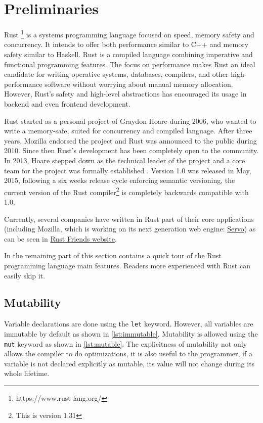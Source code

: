 \chapter{Preliminaries}
\label{chapter:preliminaries}

Rust \footnote{https://www.rust-lang.org/} is a systems programming language focused on speed, memory safety and concurrency. It intends to offer both performance similar to C++ and memory safety similar to Haskell. Rust is a compiled language combining imperative and functional programming features. The focus on performance makes Rust an ideal candidate for writing operative systems, databases, compilers, and other high-performance software without worrying about manual memory allocation. However, Rust's safety and high-level abstractions has encouraged its usage in backend and even frontend development. 

Rust started as a personal project of Graydon Hoare during 2006, who wanted to write a memory-safe, suited for concurrency and compiled language. After three years, Mozilla endorsed the project and Rust was announced to the public during 2010. Since then Rust's development has been completely open to the community. In 2013, Hoare stepped down as the technical leader of the project and a core team for the project was formally established \cite{steve_acm}. Version 1.0 was released in May, 2015, following a six weeks release cycle enforcing semantic versioning, the current version of the Rust compiler\footnote{This is version 1.31} is completely backwards compatible with 1.0.

Currently, several companies have written in Rust part of their core applications (including Mozilla, which is working on its next generation web engine: \href{https://servo.org/}{Servo}) as can be seen in \href{https://www.rust-lang.org/en-US/friends.html}{Rust Friends website}.

In the remaining part of this section contains a quick tour of the Rust programming language main features. Readers more experienced with Rust can easily skip it.

\section{Mutability}
Variable declarations are done using the \texttt{let} keyword. However, all variables are immutable by default as shown in \ref{lst:immutable}. Mutability is allowed using the \texttt{mut} keyword as shown in \ref{lst:mutable}. The explicitness of mutability not only allows the compiler to do optimizations, it is also useful to the programmer, if a variable is not declared explicitly as mutable, its value will not change during its whole lifetime.

